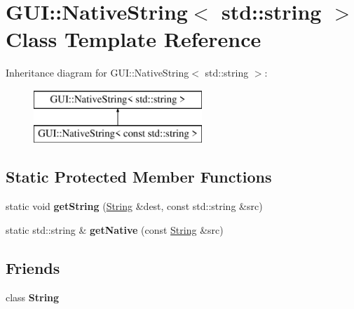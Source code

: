 \hypertarget{classGUI_1_1NativeString_3_01std_1_1string_01_4}{\section{G\-U\-I\-:\-:Native\-String$<$ std\-:\-:string $>$ Class Template Reference}
\label{classGUI_1_1NativeString_3_01std_1_1string_01_4}
}
Inheritance diagram for G\-U\-I\-:\-:Native\-String$<$ std\-:\-:string $>$\-:\begin{figure}[H]
\begin{center}
\leavevmode
\includegraphics[height=2.000000cm]{classGUI_1_1NativeString_3_01std_1_1string_01_4}
\end{center}
\end{figure}
\subsection*{Static Protected Member Functions}
\begin{DoxyCompactItemize}
\item 
\hypertarget{classGUI_1_1NativeString_3_01std_1_1string_01_4_a8dcd7b32962c95d0816c369465f6f334}{static void {\bfseries get\-String} (\hyperlink{classGUI_1_1String}{String} \&dest, const std\-::string \&src)}\label{classGUI_1_1NativeString_3_01std_1_1string_01_4_a8dcd7b32962c95d0816c369465f6f334}

\item 
\hypertarget{classGUI_1_1NativeString_3_01std_1_1string_01_4_a904de56468ae495168802087f996894e}{static std\-::string \& {\bfseries get\-Native} (const \hyperlink{classGUI_1_1String}{String} \&src)}\label{classGUI_1_1NativeString_3_01std_1_1string_01_4_a904de56468ae495168802087f996894e}

\end{DoxyCompactItemize}
\subsection*{Friends}
\begin{DoxyCompactItemize}
\item 
\hypertarget{classGUI_1_1NativeString_3_01std_1_1string_01_4_a7fb804f7dc96dd9f705c84095f37f1ca}{class {\bfseries String}}\label{classGUI_1_1NativeString_3_01std_1_1string_01_4_a7fb804f7dc96dd9f705c84095f37f1ca}

\end{DoxyCompactItemize}


